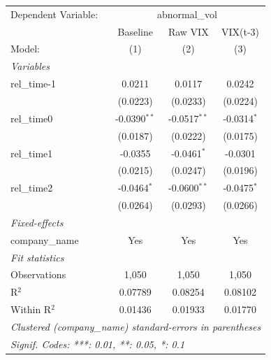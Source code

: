 
\begingroup
\centering
\begin{tabular}{lccc}
   \tabularnewline \midrule \midrule
   Dependent Variable: & \multicolumn{3}{c}{abnormal\_vol}\\
                  & Baseline       & Raw VIX        & VIX(t-3) \\   
   Model:         & (1)            & (2)            & (3)\\  
   \midrule
   \emph{Variables}\\
   rel\_time-1    & 0.0211         & 0.0117         & 0.0242\\   
                  & (0.0223)       & (0.0233)       & (0.0224)\\   
   rel\_time0     & -0.0390$^{**}$ & -0.0517$^{**}$ & -0.0314$^{*}$\\   
                  & (0.0187)       & (0.0222)       & (0.0175)\\   
   rel\_time1     & -0.0355        & -0.0461$^{*}$  & -0.0301\\   
                  & (0.0215)       & (0.0247)       & (0.0196)\\   
   rel\_time2     & -0.0464$^{*}$  & -0.0600$^{**}$ & -0.0475$^{*}$\\   
                  & (0.0264)       & (0.0293)       & (0.0266)\\   
   \midrule
   \emph{Fixed-effects}\\
   company\_name  & Yes            & Yes            & Yes\\  
   \midrule
   \emph{Fit statistics}\\
   Observations   & 1,050          & 1,050          & 1,050\\  
   R$^2$          & 0.07789        & 0.08254        & 0.08102\\  
   Within R$^2$   & 0.01436        & 0.01933        & 0.01770\\  
   \midrule \midrule
   \multicolumn{4}{l}{\emph{Clustered (company\_name) standard-errors in parentheses}}\\
   \multicolumn{4}{l}{\emph{Signif. Codes: ***: 0.01, **: 0.05, *: 0.1}}\\
\end{tabular}
\par\endgroup


